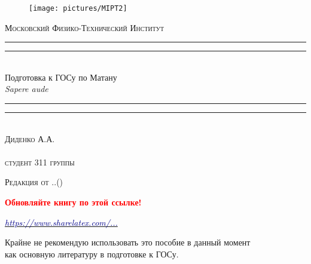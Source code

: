 \begin{titlepage}
\centering
\settowidth{\unitlength}{\LARGE\scshape Московский Физико-Технический Институт}

\begin{figure}[!h]
\center
\texttt{[image: pictures/MIPT2]}
\end{figure}
\vspace*{\baselineskip}
{\LARGE\scshape Московский Физико-Технический Институт}\\[\baselineskip]
\rule{\unitlength}{1.6pt}\vspace*{-\baselineskip}\vspace*{2pt}
\rule{\unitlength}{0.4pt}\\[1.8\baselineskip]
{\Huge Подготовка к ГОСу по Матану}\\[\baselineskip]
{\large \itshape Sapere aude}\\[0.7\baselineskip]
\rule{\unitlength}{0.4pt}\vspace*{-\baselineskip}\vspace{3.2pt}
\rule{\unitlength}{1.6pt}\\[\baselineskip]
{\Large\scshape Диденко А.А. \\ $ $\\студент 311 группы}\par
\vspace*{2\baselineskip}  




{\LARGE\scshape Редакция от \twodigit\day.\twodigit\month.\the\year \;(\currenttime)}\par %

\mbox{}

\textcolor{red}{\huge \textbf{Обновляйте книгу по этой ссылке!}}

\mbox{}

\href{https://www.sharelatex.com/github/repos/DidenkoAndre/GOS_book/builds/latest/output.pdf}{\large \textcolor{darkblue}{\textit{https://www.sharelatex.com/...}}}

\mbox{}

Крайне не рекомендую использовать это пособие ${\textbf{в данный момент}}$ \\как основную литературу в подготовке к ГОСу. \\


\end{titlepage}
